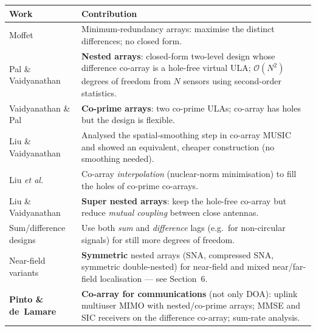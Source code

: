 \documentclass[11pt]{article}
\begin{document}
\begin{center}
\renewcommand{\arraystretch}{1.2}
\begin{tabular}{@{}p{4.3cm}p{10.3cm}@{}}
\toprule
\textbf{Work} & \textbf{Contribution}\\
\midrule
Moffet \cite{moffet1968mra} & Minimum-redundancy arrays: maximise the distinct differences; no
closed form.\\
Pal \& Vaidyanathan \cite{pal2010nested} & \textbf{Nested arrays}: closed-form two-level design whose
difference co-array is a hole-free virtual ULA; $\mathcal{O}(N^{2})$ degrees of freedom from $N$
sensors using second-order statistics.\\
Vaidyanathan \& Pal \cite{vaidyanathan2011coprime} & \textbf{Co-prime arrays}: two co-prime ULAs;
co-array has holes but the design is flexible.\\
Liu \& Vaidyanathan \cite{liu2015remarks} & Analysed the spatial-smoothing step in co-array MUSIC and
showed an equivalent, cheaper construction (no smoothing needed).\\
Liu \emph{et al.} \cite{liu2017interp} & Co-array \emph{interpolation} (nuclear-norm minimisation) to
fill the holes of co-prime co-arrays.\\
Liu \& Vaidyanathan \cite{liu2016supernested} & \textbf{Super nested arrays}: keep the hole-free
co-array but reduce \emph{mutual coupling} between close antennas.\\
Sum/difference designs \cite{zhou2020revshift,shi2025noncirc} & Use both \emph{sum} and
\emph{difference} lags (e.g.\ for non-circular signals) for still more degrees of freedom.\\
Near-field variants \cite{wang2016csna,zhang2019symdouble,chen2023hybrid} & \textbf{Symmetric} nested
arrays (SNA, compressed SNA, symmetric double-nested) for near-field and mixed near/far-field
localisation --- see Section~6.\\
\textbf{Pinto \& de~Lamare} \cite{pinto2023sra} & \textbf{Co-array for communications} (not only
DOA): uplink multiuser MIMO with nested/co-prime arrays; MMSE and SIC receivers on the difference
co-array; sum-rate analysis.\\
\bottomrule
\end{tabular}
\end{center}
\end{document}
